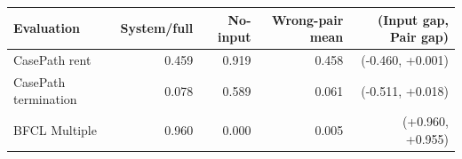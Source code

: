 \begin{tabular}{lrrrr}
\toprule
Evaluation & System/full & No-input & Wrong-pair mean & (Input gap, Pair gap) \\
\midrule
CasePath rent & 0.459 & 0.919 & 0.458 & (-0.460, +0.001) \\
CasePath termination & 0.078 & 0.589 & 0.061 & (-0.511, +0.018) \\
BFCL Multiple & 0.960 & 0.000 & 0.005 & (+0.960, +0.955) \\
\bottomrule
\end{tabular}

